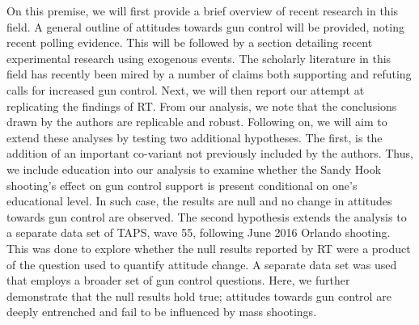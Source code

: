 \documentclass[11pt]{article}
\begin{document}
On this premise, we will first provide a brief overview of recent research in this field. A general outline of attitudes towards gun control will be provided, noting recent polling evidence. This will be followed by a section detailing recent experimental research using exogenous events. The scholarly literature in this field has recently been mired by a number of claims both supporting and refuting calls for increased gun control. Next, we will then report our attempt at replicating the findings of RT. From our analysis, we note that the conclusions drawn by the authors are replicable and robust. Following on, we will aim to extend these analyses by testing two additional hypotheses. The first, is the addition of an important co-variant not previously included by the authors. Thus, we include education into our analysis to examine whether the Sandy Hook shooting's effect on gun control support is present conditional on one's educational level. In such case, the results are null and no change in attitudes towards gun control are observed. The second hypothesis extends the analysis to a separate data set of TAPS, wave 55, following June 2016 Orlando shooting. This was done to explore whether the null results reported by RT were a product of the question used to quantify attitude change. A separate data set was used that employs a broader set of gun control questions. Here, we further demonstrate that the null results hold true; attitudes towards gun control are deeply entrenched and fail to be influenced by mass shootings.
\end{document}
